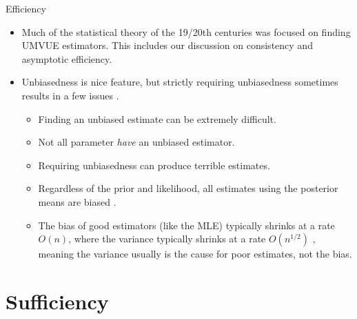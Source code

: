 \begin{frame}[allowframebreaks]{Efficiency}
  \begin{itemize}
    \item Much of the statistical theory of the 19/20th centuries was focused on finding UMVUE estimators. This includes our discussion on consistency and asymptotic efficiency.
    \item Unbiasedness is nice feature, but strictly requiring unbiasedness sometimes results in a few issues \citep[Chapter~5,][]{pawitan01}.
    \begin{itemize}
      \item Finding an unbiased estimate can be extremely difficult.
      \item Not all parameter \emph{have} an unbiased estimator.
      \item Requiring unbiasedness can produce terrible estimates.
      \item Regardless of the prior and likelihood, all estimates using the posterior means are biased \citep[Section~7.5.2,][]{casella24}.
      \item The bias of good estimators (like the MLE) typically shrinks at a rate $O(n)$, where the variance typically shrinks at a rate $O(n^{1/2})$ \citep[Chapter~5,][]{pawitan01}, meaning the variance usually is the cause for poor estimates, not the bias.
    \end{itemize}
  \end{itemize}

\end{frame}

\section{Sufficiency}

